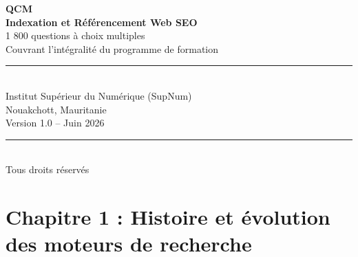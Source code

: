 \documentclass[12pt,a4paper,twoside]{report}
\begin{document}
\begin{titlepage}
\begin{center}
\vspace*{3cm}
{\Huge\textbf{QCM}}\\[1cm]
{\LARGE\textbf{Indexation et Référencement Web SEO}}\\[1.5cm]
{\Large 1 800 questions à choix multiples}\\[0.5cm]
{\large Couvrant l'intégralité du programme de formation}\\[2cm]
\rule{0.6\textwidth}{0.5pt}\\[1cm]
{\large Institut Supérieur du Numérique (SupNum)}\\[0.3cm]
{\large Nouakchott, Mauritanie}\\[0.3cm]
{\large Version 1.0 -- Juin 2026}\\[1cm]
\rule{0.6\textwidth}{0.5pt}\\[0.5cm]
{\small Tous droits réservés}
\end{center}
\end{titlepage}

\tableofcontents
\newpage



\section*{Chapitre 1 : Histoire et évolution des moteurs de recherche}
\end{document}
